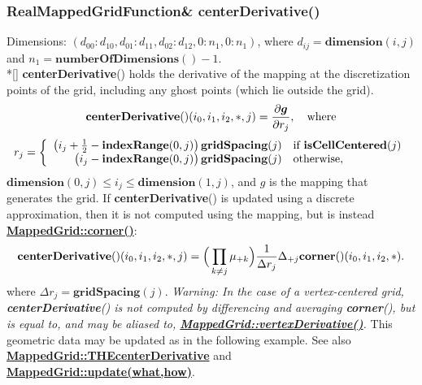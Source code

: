 \documentclass{article}
\begin{document}
  \subsubsection{RealMappedGridFunction\& centerDerivative()}
  \label{MappedGrid::centerDerivative()}
    Dimensions: $(d_{00}\colon d_{10},d_{01}\colon d_{11},d_{02}\colon d_{12},0\colon n_1,0\colon n_1)$,
    where $d_{ij} = \textbf{dimension}(i,j)$ and $n_1 = \textbf{numberOfDimensions}() - 1$. \\*[\parskip]
    \textbf{centerDerivative}() holds the derivative of the mapping at the discretization points of the grid,
    including any ghost points (which lie outside the grid).
    \[
      \textbf{centerDerivative}()(i_0,i_1,i_2,\ast,j) = {\partial \mbox{\boldmath $g$} \over \partial r_j}, \quad\mbox{where}
    \]
    \[
      r_j = \left\{ \begin{array}{rl}
        \big(i_j + {1\over2} - \textbf{indexRange}(0,j)\big)\,\textbf{gridSpacing}(j) & \mbox{if \bf{}isCellCentered}(j) \\
        \big(i_j             - \textbf{indexRange}(0,j)\big)\,\textbf{gridSpacing}(j) & \mbox{otherwise},                \\
      \end{array} \right.
    \]
    $\textbf{dimension}(0,j) \le i_j \le \textbf{dimension}(1,j)$, and {\boldmath $g$} is the mapping that generates the grid.
    If \textbf{centerDerivative}() is updated using a discrete approximation, then it is not computed using the mapping, but is instead
    {\bf{}\hyperref{corner()}{corner() \rm(\S}{)}{MappedGrid::corner()}}:
    \[
      \textbf{centerDerivative}()(i_0,i_1,i_2,\ast,j) =
      \Big(\prod_{k \ne j}\mu_{+k}\Big) {1 \over \Delta r_j} \Delta_{+j} \textbf{corner}()(i_0,i_1,i_2,\ast).
    \]
    where $\Delta r_j = \textbf{gridSpacing}(j)$.
    {\em Warning:  In the case of a vertex-centered grid, \textbf{centerDerivative}() is not computed by differencing and averaging \textbf{corner}(),
    but is equal to, and may be aliased to, {\bf{}\hyperref{vertexDerivative()}{vertexDerivative() \rm(\S}{)}{MappedGrid::vertexDerivative()}}.}
    This geometric data may be updated as in the following example.
    See also {\bf{}\hyperref{THEcenterDerivative}{THEcenterDerivative \rm(\S}{)}{MappedGrid::THEcenterDerivative}}
    and {\bf{}\hyperref{update(what,how)}{update(what,how) \rm(\S}{)}{MappedGrid::update(what,how)}}.
\end{document}
